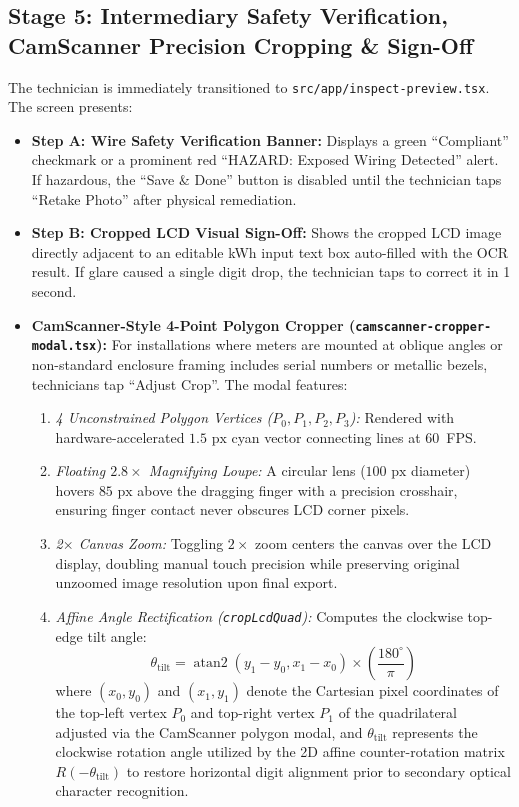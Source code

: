 \documentclass[12pt,a4paper,oneside]{report}
\begin{document}
\subsection{Stage 5: Intermediary Safety Verification, CamScanner Precision Cropping \& Sign-Off}
The technician is immediately transitioned to \texttt{src/app/inspect-preview.tsx}. The screen presents:
\begin{itemize}
    \item \textbf{Step A: Wire Safety Verification Banner:} Displays a green ``Compliant'' checkmark or a prominent red ``HAZARD: Exposed Wiring Detected'' alert. If hazardous, the ``Save \& Done'' button is disabled until the technician taps ``Retake Photo'' after physical remediation.
    \item \textbf{Step B: Cropped LCD Visual Sign-Off:} Shows the cropped LCD image directly adjacent to an editable kWh input text box auto-filled with the OCR result. If glare caused a single digit drop, the technician taps to correct it in 1 second.
    \item \textbf{CamScanner-Style 4-Point Polygon Cropper (\texttt{camscanner-cropper-modal.tsx}):} For installations where meters are mounted at oblique angles or non-standard enclosure framing includes serial numbers or metallic bezels, technicians tap ``Adjust Crop''. The modal features:
    \begin{enumerate}
        \item \textit{4 Unconstrained Polygon Vertices ($P_0, P_1, P_2, P_3$):} Rendered with hardware-accelerated $1.5\text{~px}$ cyan vector connecting lines at 60~FPS.
        \item \textit{Floating $2.8\times$ Magnifying Loupe:} A circular lens ($100\text{~px}$ diameter) hovers $85\text{~px}$ above the dragging finger with a precision crosshair, ensuring finger contact never obscures LCD corner pixels.
        \item \textit{2$\times$ Canvas Zoom:} Toggling $2\times$ zoom centers the canvas over the LCD display, doubling manual touch precision while preserving original unzoomed image resolution upon final export.
        \item \textit{Affine Angle Rectification (\texttt{cropLcdQuad}):} Computes the clockwise top-edge tilt angle:
        \begin{equation}
        \theta_{\text{tilt}} = \operatorname{atan2}(y_1 - y_0, x_1 - x_0) \times \left(\frac{180^\circ}{\pi}\right)
        \end{equation}
        where $(x_0, y_0)$ and $(x_1, y_1)$ denote the Cartesian pixel coordinates of the top-left vertex $P_0$ and top-right vertex $P_1$ of the quadrilateral adjusted via the CamScanner polygon modal, and $\theta_{\text{tilt}}$ represents the clockwise rotation angle utilized by the 2D affine counter-rotation matrix $R(-\theta_{\text{tilt}})$ to restore horizontal digit alignment prior to secondary optical character recognition.

\end{enumerate}
\end{itemize}
\end{document}
